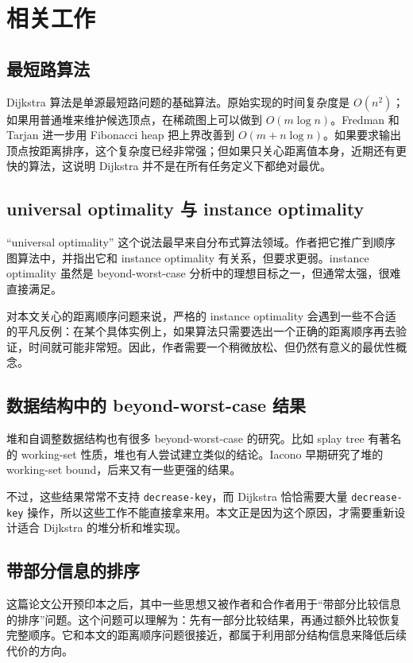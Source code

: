 \documentclass[UTF8]{ctexart}
\begin{document}
\section*{相关工作}
\subsection*{最短路算法}
Dijkstra 算法是单源最短路问题的基础算法。原始实现的时间复杂度是 $O(n^2)$；如果用普通堆来维护候选顶点，在稀疏图上可以做到 $O(m\log n)$。Fredman 和 Tarjan 进一步用 Fibonacci heap 把上界改善到 $O(m+n\log n)$。如果要求输出顶点按距离排序，这个复杂度已经非常强；但如果只关心距离值本身，近期还有更快的算法，这说明 Dijkstra 并不是在所有任务定义下都绝对最优。

\subsection*{universal optimality 与 instance optimality}
“universal optimality” 这个说法最早来自分布式算法领域。作者把它推广到顺序图算法中，并指出它和 instance optimality 有关系，但要求更弱。instance optimality 虽然是 beyond-worst-case 分析中的理想目标之一，但通常太强，很难直接满足。

对本文关心的距离顺序问题来说，严格的 instance optimality 会遇到一些不合适的平凡反例：在某个具体实例上，如果算法只需要选出一个正确的距离顺序再去验证，时间就可能非常短。因此，作者需要一个稍微放松、但仍然有意义的最优性概念。

\subsection*{数据结构中的 beyond-worst-case 结果}
堆和自调整数据结构也有很多 beyond-worst-case 的研究。比如 splay tree 有著名的 working-set 性质，堆也有人尝试建立类似的结论。Iacono 早期研究了堆的 working-set bound，后来又有一些更强的结果。

不过，这些结果常常不支持 \texttt{decrease-key}，而 Dijkstra 恰恰需要大量 \texttt{decrease-key} 操作，所以这些工作不能直接拿来用。本文正是因为这个原因，才需要重新设计适合 Dijkstra 的堆分析和堆实现。

\subsection*{带部分信息的排序}
这篇论文公开预印本之后，其中一些思想又被作者和合作者用于“带部分比较信息的排序”问题。这个问题可以理解为：先有一部分比较结果，再通过额外比较恢复完整顺序。它和本文的距离顺序问题很接近，都属于利用部分结构信息来降低后续代价的方向。
\end{document}
